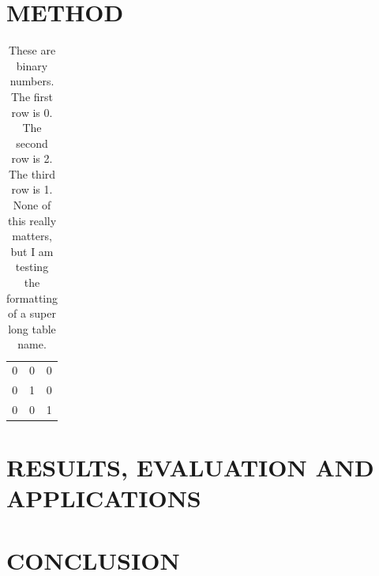 \documentclass[titlepage]{report}
\begin{document}
	\blindtext
	
	\section{METHOD}
	
	\blindtext
	\begin{table}[h!]
		\centering
		\begin{tabular}{ |c|c|c| } 
			\hline
			0 & 0 & 0 \\ 
			0 & 1 & 0\\ 
			0 & 0 & 1 \\ 
			\hline
		\end{tabular}
		\caption{These are binary numbers. The first row is 0. The second row is 2. The third row is 1. None of this really matters, but I am testing the formatting of a super long table name.}	
	\end{table}
	
	\blindtext
	
	\section{RESULTS, EVALUATION AND APPLICATIONS}
	
	\blindtext
	
	\section{CONCLUSION}
	
	\blindtext
\end{document}

